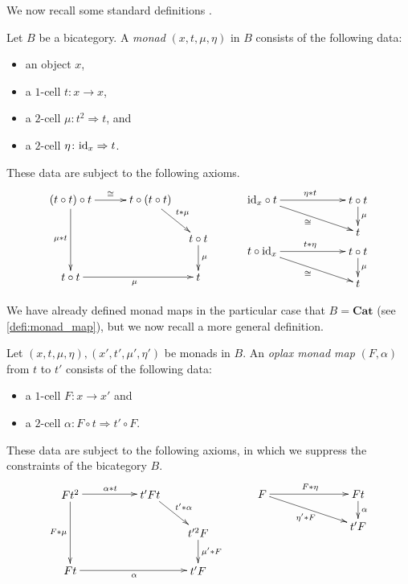 We now recall some standard definitions \cite{ben-bicats}.

\begin{Defi}
Let $B$ be a bicategory. A \emph{monad} $(x,t,\mu,\eta)$ in $B$ consists of the following data:
\begin{itemize}
  \item an object $x$,
  \item a $1$-cell $t \colon  x \rightarrow x$,
  \item a $2$-cell $\mu \colon t^{2} \Rightarrow t$, and
  \item a $2$-cell $\eta \colon \textrm{id}_x \Rightarrow t$.
\end{itemize}
These data are subject to the following axioms.
  \[
    \xy
      (0,0)*+{(t \circ t) \circ t} ="1";
      (25,0)*+{t \circ (t \circ t)} ="2";
      (40,-12)*+{t \circ t} ="3";
      (0,-24)*+{t \circ t} ="4";
      (40,-24)*+{t} ="5";
      {\ar^{\cong} "1";"2" };
      {\ar^{t * \mu} "2";"3" };
      {\ar^{\mu} "3";"5" };
      {\ar_{\mu * t} "1";"4" };
      {\ar_{\mu} "4";"5" };
      (60,0)*+{\id_{x} \circ t} ="11";
      (90,0)*+{t \circ t} ="12";
      (90,-10)*+{t} ="13";
      {\ar^{\eta * t} "11";"12" };
      {\ar^{\mu} "12";"13" };
      {\ar_{\cong} "11";"13" };
      (60,-16)*+{t \circ \id_{x}} ="11";
      (90,-16)*+{t \circ t} ="12";
      (90,-26)*+{t} ="13";
      {\ar^{t * \eta} "11";"12" };
      {\ar^{\mu} "12";"13" };
      {\ar_{\cong} "11";"13" };
    \endxy
  \]
\end{Defi}

We have already defined monad maps in the particular case that $B = \textbf{Cat}$ (see \cref{defi:monad_map}), but we now recall a more general definition.
\begin{Defi}
Let $(x,t,\mu,\eta), (x',t',\mu',\eta')$ be monads in $B$. An \emph{oplax monad map} $(F, \alpha)$ from $t$ to $t'$ consists of the following data:
\begin{itemize}
\item a $1$-cell $F \colon x \rightarrow x'$ and
\item a $2$-cell $\alpha \colon F \circ t \Rightarrow t' \circ F$.
\end{itemize}
These data are subject to the following axioms, in which we suppress the constraints of the bicategory $B$.
  \[
    \xy
      (0,0)*+{Ft^{2}} ="1";
      (25,0)*+{t'Ft} ="2";
      (40,-12)*+{t'^{2} F} ="3";
      (0,-24)*+{Ft} ="4";
      (40,-24)*+{t'F} ="5";
      {\ar^{\alpha * t} "1";"2" };
      {\ar^{t' * \alpha} "2";"3" };
      {\ar^{\mu' * F} "3";"5" };
      {\ar_{F * \mu} "1";"4" };
      {\ar_{\alpha} "4";"5" };
      (60,0)*+{F} ="11";
      (90,0)*+{Ft} ="12";
      (90,-10)*+{t'F} ="13";
      {\ar^{F*\eta} "11";"12" };
      {\ar^{\alpha} "12";"13" };
      {\ar_{\eta'*F} "11";"13" };
    \endxy
  \]
\end{Defi}

